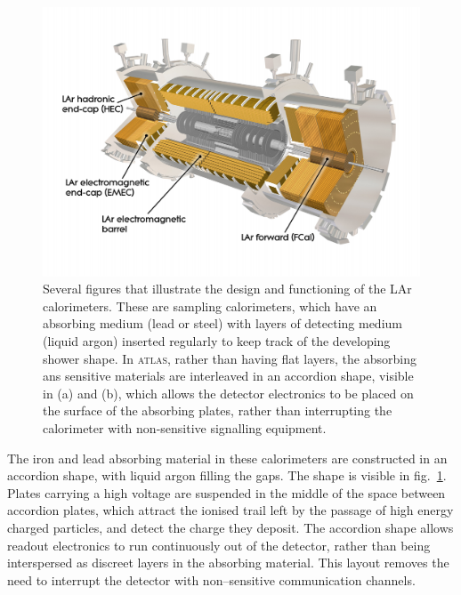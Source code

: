 \begin{figure}[htp]
\begin{minipage}[b]{.59\textwidth}
    \begin{center}
    \includegraphics[width=1\textwidth]{figures/CaloDiag.png}
    \end{center}
\end{minipage}
\begin{minipage}[b]{.4\textwidth}
\caption{Several figures \cite{atlasweb} that illustrate the design and functioning of the LAr calorimeters. These are sampling calorimeters, which have an absorbing medium (lead or steel) with layers of detecting medium (liquid argon) inserted regularly to keep track of the developing shower shape. In \textsc{atlas}, rather than having flat layers, the absorbing ans sensitive materials are interleaved in an accordion shape, visible in (a) and (b), which allows the detector electronics to be placed on the surface of the absorbing plates, rather than interrupting the calorimeter with non-sensitive signalling equipment.
\label{calostruc}}
\end{minipage}
\end{figure}

The iron and lead absorbing material in these calorimeters are constructed in an accordion shape, with liquid argon filling the gaps. The shape is visible in fig.~\ref{calostruc}. Plates carrying a high voltage are suspended in the middle of the space between accordion plates, which attract the ionised trail left by the passage of high energy charged particles, and detect the charge they deposit. The accordion shape allows readout electronics to run continuously out of the detector, rather than being interspersed as discreet layers in the absorbing material. This layout removes the need to interrupt the detector with non--sensitive communication channels.

